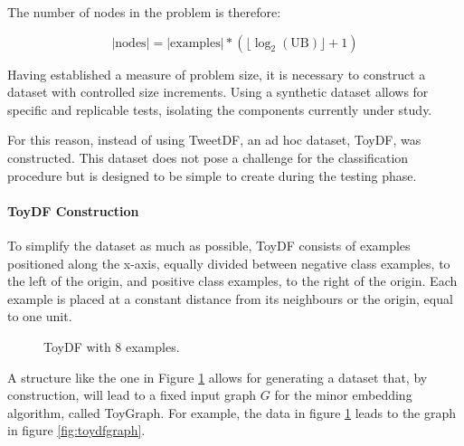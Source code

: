 The number of nodes in the problem is therefore:

\begin{equation}\label{eq:nodesnum}
	|\text{nodes}| = |\text{examples}|*(\lfloor\log_2(\text{UB})\rfloor + 1)
\end{equation}

Having established a measure of problem size, it is necessary to construct a dataset with controlled size increments. 
Using a synthetic dataset allows for specific and replicable tests, isolating the components currently under study.

For this reason, instead of using TweetDF, an ad hoc dataset, ToyDF, was constructed. 
This dataset does not pose a challenge for the classification procedure but is designed to be simple to create during the testing phase.

\paragraph{ToyDF Construction} To simplify the dataset as much as possible, ToyDF consists of examples positioned along the x-axis, equally divided between negative class examples, to the left of the origin, and positive class examples, to the right of the origin. 
Each example is placed at a constant distance from its neighbours or the origin, equal to one unit.

\begin{figure}[H]
    \centering
    \caption{ToyDF with 8 examples.}
    \label{fig:toydf}
\end{figure}

A structure like the one in Figure \ref{fig:toydf} allows for generating a dataset that, by construction, will lead to a fixed input graph $G$ for the minor embedding algorithm, called ToyGraph. 
For example, the data in figure \ref{fig:toydf} leads to the graph in figure \ref{fig:toydfgraph}.

